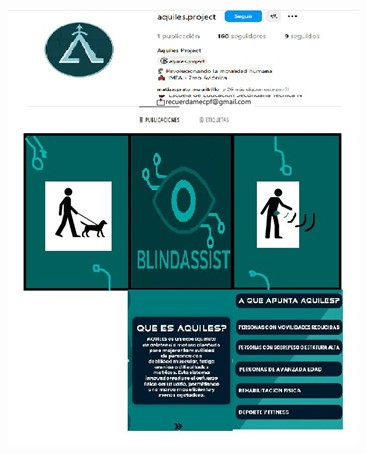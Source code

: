 \documentclass[12pt,a4paper]{article}
\begin{document}
\begin{figure}[H]
    \centering
    \begin{minipage}{0.45\textwidth}
        \centering
        \includegraphics[width=\linewidth]{Carpeta de campo/Imagen2.jpg}
    \end{minipage}
    \hfill %
    \begin{minipage}{0.45\textwidth}
        \centering

\end{minipage}
\end{figure}
\end{document}
